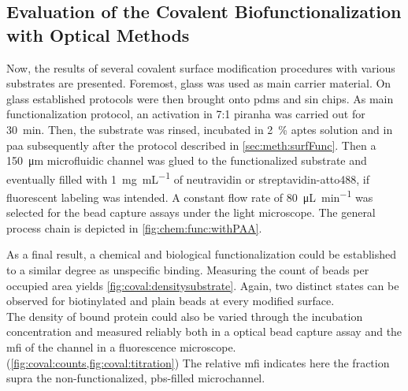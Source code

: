 \subsection{Evaluation of the Covalent Biofunctionalization with Optical Methods}
\label{sec:res:coval}
Now, the results of several covalent surface modification procedures with various substrates are presented. Foremost, glass was used as main carrier material. On glass established protocols were then brought onto \gls{pdms} and \gls{sin} chips. As main functionalization protocol, an activation in 7:1 \gls{piranha} was carried out for \SI{30}{\minute}. Then, the substrate was rinsed, incubated in \SI{2}{\percent} \gls{aptes} solution and in \gls{paa} subsequently after the protocol described in \cref{sec:meth:surfFunc}. Then a \SI{150}{\micro\meter} microfluidic channel was glued to the functionalized substrate and eventually filled with \SI{1}{\milli\gram\per\milli\liter} of neutravidin or streptavidin-atto488, if fluorescent labeling was intended. A constant flow rate of \SI{80}{\micro\liter\per\minute} was selected for the bead capture assays under the light microscope. The general process chain is depicted in \cref{fig:chem:func:withPAA}.


As a final result, a chemical and biological functionalization could be established to a similar degree as unspecific binding. Measuring the count of beads per occupied area yields \cref{fig:coval:densitysubstrate}. Again, two distinct states can be observed for biotinylated and plain beads at every modified surface.\\
The density of bound protein could also be varied through the incubation concentration and measured reliably both in a optical bead capture assay and the \gls{mfi} of the channel in a fluorescence microscope.(\cref{fig:coval:counts,fig:coval:titration}) The relative \gls{mfi} indicates here the fraction supra the non-functionalized, \gls{pbs}-filled microchannel. 

